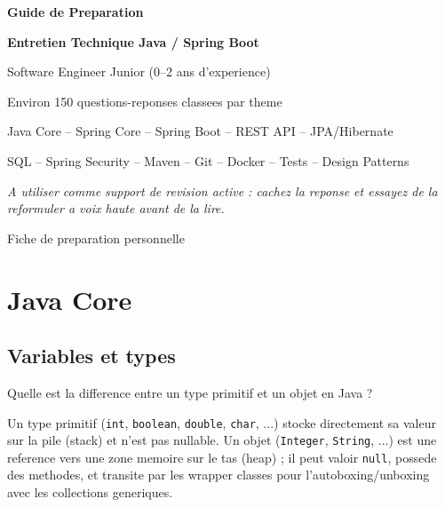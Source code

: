\documentclass[11pt,a4paper]{article}
\begin{document}
\begin{titlepage}
  \centering
  \vspace*{2cm}
  {\Huge\bfseries\color{springdark} Guide de Preparation\par}
  \vspace{0.5cm}
  {\LARGE\bfseries\color{springgreen} Entretien Technique Java / Spring Boot\par}
  \vspace{0.3cm}
  {\Large Software Engineer Junior (0--2 ans d'experience)\par}
  \vspace{1.5cm}
  {\large Environ 150 questions-reponses classees par theme\par}
  \vspace{0.3cm}
  {\large Java Core -- Spring Core -- Spring Boot -- REST API -- JPA/Hibernate\par}
  {\large SQL -- Spring Security -- Maven -- Git -- Docker -- Tests -- Design Patterns\par}
  \vfill
  {\normalsize\textit{A utiliser comme support de revision active : cachez la reponse et essayez de la reformuler a voix haute avant de la lire.}\par}
  \vspace{1cm}
  {\small Fiche de preparation personnelle\par}
\end{titlepage}

\tableofcontents
\newpage

\section{Java Core}

\subsection{Variables et types}

\begin{question} Quelle est la difference entre un type primitif et un objet en Java ?
\end{question}
\begin{reponse}
Un type primitif (\texttt{int}, \texttt{boolean}, \texttt{double}, \texttt{char}, ...) stocke directement sa valeur sur la pile (stack) et n'est pas nullable. Un objet (\texttt{Integer}, \texttt{String}, ...) est une reference vers une zone memoire sur le tas (heap) ; il peut valoir \texttt{null}, possede des methodes, et transite par les wrapper classes pour l'autoboxing/unboxing avec les collections generiques.
\end{reponse}
\end{document}
